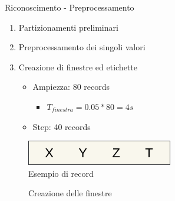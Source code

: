 \begin{tframe}{Riconoscimento - Preprocessamento}

    \begin{minipage}{0.64\textwidth}
        \begin{enumerate}
            \item Partizionamenti preliminari
            \item Preprocessamento dei singoli valori
            \item Creazione di finestre ed etichette
                \begin{itemize}
                    \item Ampiezza: 80 records
                        \begin{itemize}
                            \item $T_{finestra} = 0.05 * 80 = 4s$
                        \end{itemize}
                    \item Step: 40 records
                \end{itemize}
    
        \end{enumerate}
    \end{minipage}%
    \hfill
    \begin{minipage}{0.36\textwidth}
        
        \begin{figure}
            \includegraphics[scale = 0.35]{assets/images/classification/record2.png}
            \caption*{Esempio di record}
        \end{figure}
        
    \end{minipage}%

    \vspace{3mm}
    \vfill
    \begin{figure}
        
        \caption*{Creazione delle finestre}
    \end{figure}

\end{tframe}